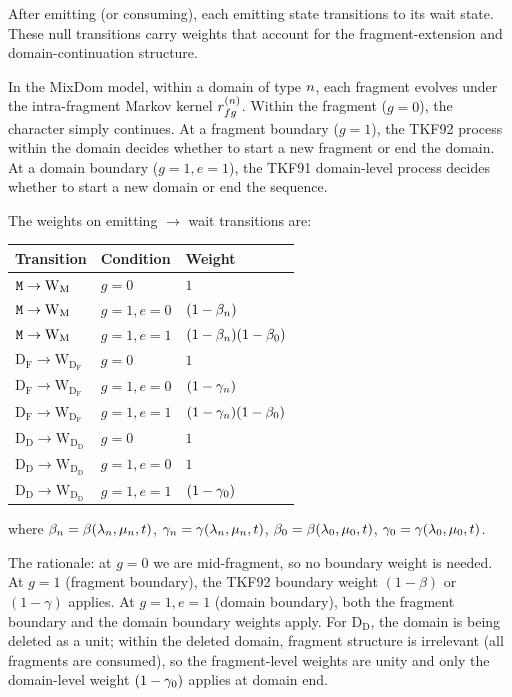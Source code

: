 After emitting (or consuming), each emitting state transitions to its wait state.
These null transitions carry weights that account for the fragment-extension
and domain-continuation structure.

In the MixDom model, within a domain of type $n$, each fragment evolves
under the intra-fragment Markov kernel $r^{(n)}_{fg}$.
Within the fragment ($g=0$), the character simply continues.
At a fragment boundary ($g=1$), the TKF92 process within the domain decides
whether to start a new fragment or end the domain.
At a domain boundary ($g=1, e=1$), the TKF91 domain-level process decides
whether to start a new domain or end the sequence.

The weights on emitting $\to$ wait transitions are:

\begin{center}
\renewcommand{\arraystretch}{1.5}
\begin{tabular}{lll}
\hline
Transition & Condition & Weight \\
\hline
${\tt M} \to \mathrm{W_M}$ & $g=0$ & $1$ \\
${\tt M} \to \mathrm{W_M}$ & $g=1, e=0$ &
  $(1-\beta_n)$ \\
${\tt M} \to \mathrm{W_M}$ & $g=1, e=1$ &
  $(1-\beta_n)(1-\beta_0)$ \\[4pt]
$\mathrm{D_F} \to \mathrm{W_{D_F}}$ & $g=0$ & $1$ \\
$\mathrm{D_F} \to \mathrm{W_{D_F}}$ & $g=1, e=0$ &
  $(1-\gamma_n)$ \\
$\mathrm{D_F} \to \mathrm{W_{D_F}}$ & $g=1, e=1$ &
  $(1-\gamma_n)(1-\beta_0)$ \\[4pt]
$\mathrm{D_D} \to \mathrm{W_{D_D}}$ & $g=0$ & $1$ \\
$\mathrm{D_D} \to \mathrm{W_{D_D}}$ & $g=1, e=0$ & $1$ \\
$\mathrm{D_D} \to \mathrm{W_{D_D}}$ & $g=1, e=1$ &
  $(1-\gamma_0)$ \\
\hline
\end{tabular}
\end{center}
where $\beta_n = \beta(\lambda_n, \mu_n, t)$,
$\gamma_n = \gamma(\lambda_n, \mu_n, t)$,
$\beta_0 = \beta(\lambda_0, \mu_0, t)$,
$\gamma_0 = \gamma(\lambda_0, \mu_0, t)$.

The rationale: at $g=0$ we are mid-fragment, so no boundary weight is needed.
At $g=1$ (fragment boundary), the TKF92 boundary weight $(1-\beta)$ or $(1-\gamma)$ applies.
At $g=1, e=1$ (domain boundary), both the fragment boundary and the domain boundary
weights apply.
For $\mathrm{D_D}$, the domain is being deleted as a unit; within the deleted domain,
fragment structure is irrelevant (all fragments are consumed), so the fragment-level
weights are unity and only the domain-level weight $(1-\gamma_0)$ applies at domain end.

